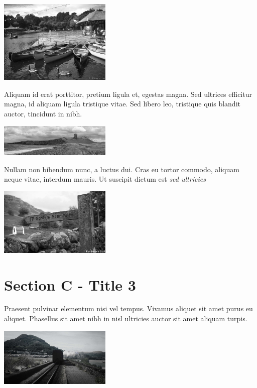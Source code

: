 \documentclass[10.5pt,a4paper]{article} %
\begin{document}
\begin{multicols*}{2}
\begin{center}
	\includegraphics[width=0.40\textwidth]{sample_001.png} %
\end{center}

Aliquam id erat porttitor, pretium ligula et, egestas magna. Sed ultrices efficitur magna, id aliquam ligula tristique vitae. Sed libero leo, tristique quis blandit auctor, tincidunt in nibh.

\begin{center}
	\includegraphics[width=0.40\textwidth]{sample_002.png}
\end{center}

Nullam non bibendum nunc, a luctus dui. Cras eu tortor commodo, aliquam neque vitae, interdum mauris. Ut suscipit dictum est \textit{sed ultricies}

\begin{center}
	\includegraphics[width=0.40\textwidth]{sample_003.png}
\end{center}



\section*{Section C - Title 3}

Praesent pulvinar elementum nisi vel tempus. Vivamus aliquet sit amet purus eu aliquet. Phasellus sit amet nibh in nisl ultricies auctor sit amet aliquam turpis.

\begin{center}
	\includegraphics[width=0.40\textwidth]{sample_004.png}
\end{center}


\end{multicols*}
\end{document}
